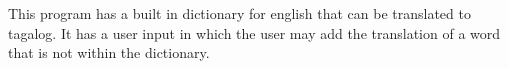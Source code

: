 This program has a built in dictionary for english that can be translated to tagalog. It has a user input in which the user may add the translation of a word that is not within the dictionary. 
